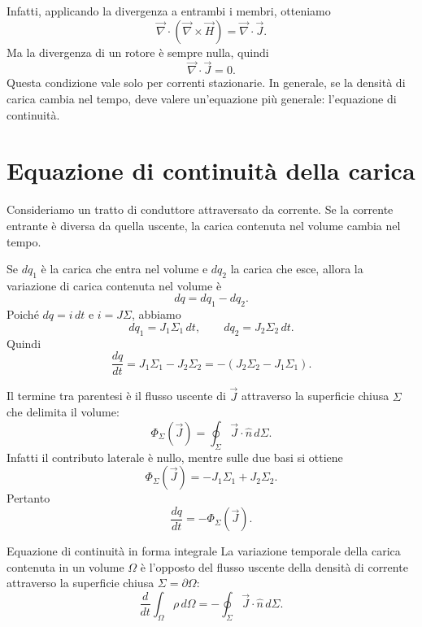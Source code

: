\documentclass[a4paper]{article}
\begin{document}
Infatti, applicando la divergenza a entrambi i membri, otteniamo
\[
\vec{\nabla}\cdot\left(\vec{\nabla}\times\vec{H}\right)=\vec{\nabla}\cdot\vec{J}.
\]
Ma la divergenza di un rotore è sempre nulla, quindi
\[
\vec{\nabla}\cdot\vec{J}=0.
\]
Questa condizione vale solo per correnti stazionarie. In generale, se la densità di carica cambia nel tempo, deve valere un'equazione più generale: l'equazione di continuità.

\section{Equazione di continuità della carica}

Consideriamo un tratto di conduttore attraversato da corrente. Se la corrente entrante è diversa da quella uscente, la carica contenuta nel volume cambia nel tempo.

\begin{center}
\end{center}

Se \(dq_1\) è la carica che entra nel volume e \(dq_2\) la carica che esce, allora la variazione di carica contenuta nel volume è
\[
dq=dq_1-dq_2.
\]
Poiché \(dq=i\,dt\) e \(i=J\Sigma\), abbiamo
\[
dq_1=J_1\Sigma_1\,dt,
\qquad
dq_2=J_2\Sigma_2\,dt.
\]
Quindi
\[
\frac{dq}{dt}=J_1\Sigma_1-J_2\Sigma_2
=-\left(J_2\Sigma_2-J_1\Sigma_1\right).
\]

Il termine tra parentesi è il flusso uscente di \(\vec{J}\) attraverso la superficie chiusa \(\Sigma\) che delimita il volume:
\[
\Phi_\Sigma(\vec{J})=\oint_\Sigma \vec{J}\cdot\hat{n}\,d\Sigma.
\]
Infatti il contributo laterale è nullo, mentre sulle due basi si ottiene
\[
\Phi_\Sigma(\vec{J})=-J_1\Sigma_1+J_2\Sigma_2.
\]
Pertanto
\[
\frac{dq}{dt}=-\Phi_\Sigma(\vec{J}).
\]

\begin{snippetproposition}{Equazione di continuità in forma integrale}
La variazione temporale della carica contenuta in un volume \(\Omega\) è l'opposto del flusso uscente della densità di corrente attraverso la superficie chiusa \(\Sigma=\partial\Omega\):
\[
    \frac{d}{dt}\int_\Omega \rho\,d\Omega
    =-\oint_\Sigma \vec{J}\cdot\hat{n}\,d\Sigma.
\]
\end{snippetproposition}
\end{document}
